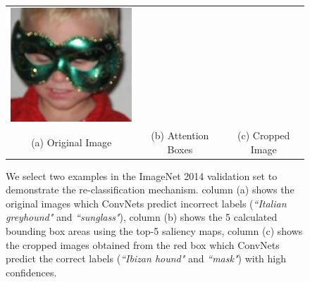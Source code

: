 \begin{figure}[htb]
\begin{center}
\begin{tabular}{ccc}
\includegraphics[width=0.33\linewidth,height=0.3\linewidth]{figs/re-classification/crop_image/ILSVRC2012_val_00000608} \\
{\small (a) Original Image} &
{\small (b) Attention Boxes} &
{\small (c) Cropped Image} \\
\end{tabular}
\caption{We select two examples in the ImageNet 2014 validation set to demonstrate the re-classification mechanism. column (a) shows the original images which ConvNets predict incorrect labels ({\em ``Italian greyhound"} and {\em ``sunglass"}), column (b) shows the 5 calculated bounding box areas using the top-5 saliency maps, column (c) shows the cropped images obtained from the red box which ConvNets predict the correct labels ({\em ``Ibizan hound"} and {\em ``mask"}) with high confidences.}
\label{fig:reclassification_examples}
\end{center}
\end{figure}


